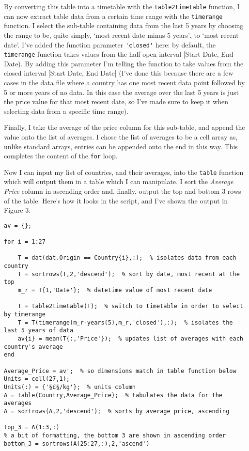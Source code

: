 \documentclass[a4paper,12pt]{article}
\begin{document}
By converting this table into a timetable with the \verb!table2timetable! function, I can now extract table data from a certain time range with the \verb!timerange! function. I select the sub-table containing data from the last 5 years by choosing the range to be, quite simply, `most recent date minus 5 years', to `most recent date'. I've added the function parameter \verb!'closed'! here: by default, the \verb!timerange! function takes values from the half-open interval [Start Date, End Date). By adding this parameter I'm telling the function to take values from the closed interval [Start Date, End Date] (I've done this because there are a few cases in the data file where a country has one most recent data point followed by 5 or more years of no data. In this case the average over the last 5 years is just the price value for that most recent date, so I've made sure to keep it when selecting data from a specific time range). 

Finally, I take the average of the price column for this sub-table, and append the value onto the list of averages. I chose the list of averages to be a cell array as, unlike standard arrays, entries can be appended onto the end in this way. This completes the content of the \verb!for! loop.

Now I can input my list of countries, and their averages, into the \verb!table! function which will output them in a table which I can manipulate. I sort the \textit{Average Price} column in ascending order and, finally, output the top and bottom 3 rows of the table. Here's how it looks in the script, and I've shown the output in Figure 3:

\begin{lstlisting}
av = {};

for i = 1:27
    
    T = dat(dat.Origin == Country{i},:);  % isolates data from each country
    T = sortrows(T,2,'descend');  % sort by date, most recent at the top
    m_r = T{1,'Date'};  % datetime value of most recent date
    
    T = table2timetable(T);  % switch to timetable in order to select by timerange
    T = T(timerange(m_r-years(5),m_r,'closed'),:);  % isolates the last 5 years of data
    av{i} = mean(T{:,'Price'});  % updates list of averages with each country's average
end

Average_Price = av';  % so dimensions match in table function below
Units = cell(27,1);
Units(:) = {'§£§/kg'};  % units column
A = table(Country,Average_Price);  % tabulates the data for the averages
A = sortrows(A,2,'descend');  % sorts by average price, ascending

top_3 = A(1:3,:)
% a bit of formatting, the bottom 3 are shown in ascending order
bottom_3 = sortrows(A(25:27,:),2,'ascend')
\end{lstlisting}
\end{document}
